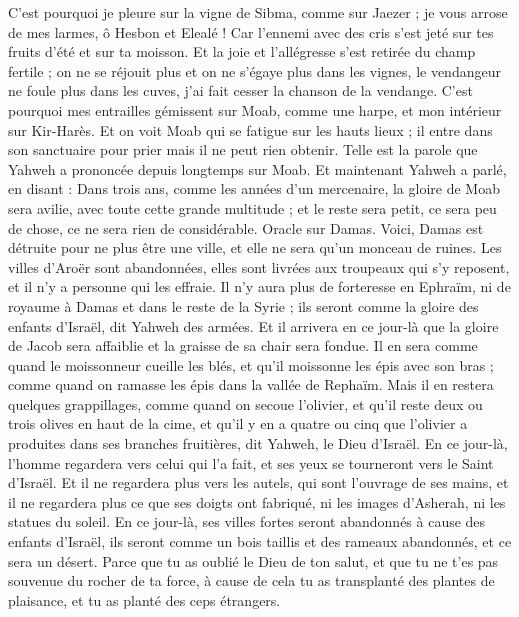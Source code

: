 \begin{multicols}{2}
C'est pourquoi je pleure sur la vigne de Sibma, comme sur Jaezer ; je vous arrose de mes larmes, ô Hesbon et Elealé ! Car l'ennemi avec des cris s'est jeté sur tes fruits d'été et sur ta moisson.
Et la joie et l'allégresse s'est retirée du champ fertile ; on ne se réjouit plus et on ne s'égaye plus dans les vignes, le vendangeur ne foule plus dans les cuves, j'ai fait cesser la chanson de la vendange.
C'est pourquoi mes entrailles gémissent sur Moab, comme une harpe, et mon intérieur sur Kir-Harès.
Et on voit Moab qui se fatigue sur les hauts lieux ; il entre dans son sanctuaire pour prier mais il ne peut rien obtenir.
Telle est la parole que Yahweh a prononcée depuis longtemps sur Moab.
Et maintenant Yahweh a parlé, en disant : Dans trois ans, comme les années d'un mercenaire, la gloire de Moab sera avilie, avec toute cette grande multitude ; et le reste sera petit, ce sera peu de chose, ce ne sera rien de considérable.
\VerseOne{}Oracle sur Damas. Voici, Damas est détruite pour ne plus être une ville, et elle ne sera qu'un monceau de ruines.
Les villes d'Aroër sont abandonnées, elles sont livrées aux troupeaux qui s'y reposent, et il n'y a personne qui les effraie.
Il n'y aura plus de forteresse en Ephraïm, ni de royaume à Damas et dans le reste de la Syrie ; ils seront comme la gloire des enfants d'Israël, dit Yahweh des armées.
Et il arrivera en ce jour-là que la gloire de Jacob sera affaiblie et la graisse de sa chair sera fondue.
Il en sera comme quand le moissonneur cueille les blés, et qu'il moissonne les épis avec son bras ; comme quand on ramasse les épis dans la vallée de Rephaïm.
Mais il en restera quelques grappillages, comme quand on secoue l'olivier, et qu'il reste deux ou trois olives en haut de la cime, et qu'il y en a quatre ou cinq que l'olivier a produites dans ses branches fruitières, dit Yahweh, le Dieu d'Israël.
En ce jour-là, l'homme regardera vers celui qui l'a fait, et ses yeux se tourneront vers le Saint d'Israël.
Et il ne regardera plus vers les autels, qui sont l'ouvrage de ses mains, et il ne regardera plus ce que ses doigts ont fabriqué, ni les images d'Asherah, ni les statues du soleil.
En ce jour-là, ses villes fortes seront abandonnés à cause des enfants d'Israël, ils seront comme un bois taillis et des rameaux abandonnés, et ce sera un désert.
Parce que tu as oublié le Dieu de ton salut, et que tu ne t'es pas souvenue du rocher de ta force, à cause de cela tu as transplanté des plantes de plaisance, et tu as planté des ceps étrangers.

\end{multicols}
